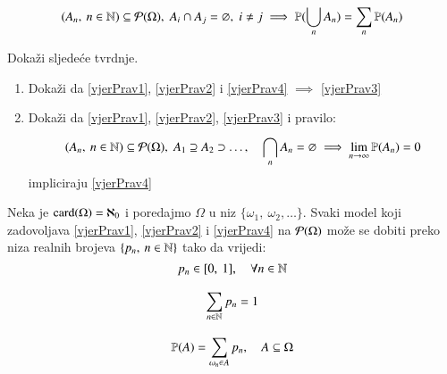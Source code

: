 \begin{equation} \label{vjerPrav4}
    (A_n, \: n \in \mathbb{N}) \subseteq \mathcal{P}({\Omega}), \; A_i
        \cap A_j = \varnothing, \; i \neq j \implies
        \mathbb{P}({\bigcup\limits_{n}^{} A_n}) = \sum\limits_{n}^{} \mathbb{P}({A_n})
\end{equation}

\begin{zad} \label{zadatak12}
    Doka\v zi sljede\' ce tvrdnje.
    \begin{enumerate}[label=(\alph*)]
        \item Doka\v zi da \eqref{vjerPrav1}, \eqref{vjerPrav2}
            i \eqref{vjerPrav4} $\implies$ \eqref{vjerPrav3}
        \item Doka\v zi da \eqref{vjerPrav1}, \eqref{vjerPrav2},
            \eqref{vjerPrav3} i pravilo:
            \begin{align} \label{neprPrazSkup}
                (A_n, \: n \in \mathbb{N}) \subseteq \mathcal{P}({\Omega}),
                    \; A_1 \supseteq A_2 \supset \dots, \quad
                    \bigcap\limits_{n}^{} A_n
                    = \varnothing \implies \lim_{n \to \infty}
                    \mathbb{P}({A_n}) = 0
             \end{align}
             impliciraju \eqref{vjerPrav4}
    \end{enumerate}
\end{zad}


\begin{pr} \label{primjer14}
    Neka je $\textnormal{card}({\Omega}) = \aleph_0$ i poredajmo $\Omega$ u niz
    $\{ \omega_1, \: \omega_2, \dots \}$. Svaki model koji
    zadovoljava \eqref{vjerPrav1}, \eqref{vjerPrav2} i
    \eqref{vjerPrav4} na $\mathcal{P}({\Omega})$ mo\v ze se dobiti
    preko niza realnih brojeva $\{p_n, \: n \in \mathbb{N} \}$ tako da
    vrijedi:
    \begin{equation}   %
        p_n \in [0, \: 1], \quad \forall n \in \N
    \end{equation}

    \begin{equation}
        \sum\limits_{n \in \mathbb{N}}^{} p_n = 1
    \end{equation}

    \begin{equation} \label{prebVP}
        \mathbb{P}({A}) = \sum\limits_{\omega_n \in A}^{} p_n, \quad A
            \subseteq \Omega
    \end{equation}
\end{pr}


